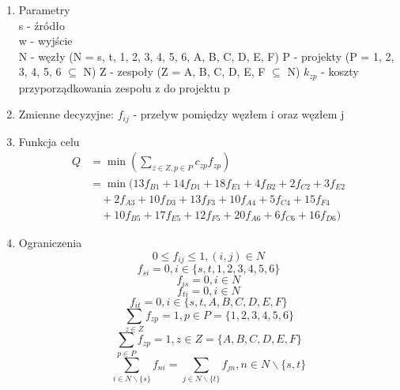 \begin{enumerate}
\item Parametry \\
s - źródło \\
w - wyjście \\
N - węzły (N = {s, t, 1, 2, 3, 4, 5, 6, A, B, C, D, E, F})
P - projekty (P = {1, 2, 3, 4, 5, 6} $\subseteq$ N)
Z - zespoły (Z = {A, B, C, D, E, F} $\subseteq$ N)
$k_{zp}$  - koszty przyporządkowania zespołu z do projektu p

\item Zmienne decyzyjne:
$f_{ij}$ - przeływ pomiędzy węzłem i oraz węzłem j
\item Funkcja celu
\begin{align*}
    Q &= \min \left(\sum_{z \in Z, p \in P} c_{zp}f_{zp} \right) \\
    &= \min \big( 13f_{B1} + 14f_{D1} + 18f_{E1} + 4f_{B2} + 2f_{C2} + 3f_{E2} \\
    &\quad + 2f_{A3} + 10f_{D3} + 13f_{F3} + 10f_{A4} + 5f_{C4} + 15f_{F4} \\
    &\quad + 10f_{B5} + 17f_{E5} + 12f_{F5} + 20f_{A6} + 6f_{C6} + 16f_{D6} \big)
\end{align*}


\item Ograniczenia
\setcounter{equation}{0}
\begin{equation}
0 \leq f_{ij} \leq 1, (i, j) \in N
\end{equation}
\begin{equation}
f_{si} = 0, i \in \{ s, t, 1, 2, 3, 4, 5, 6 \}
\end{equation}
\begin{equation}
f_{is} = 0, i \in N
\end{equation}
\begin{equation}
f_{ti} = 0, i \in N
\end{equation}
\begin{equation}
f_{it} = 0, i \in \{s, t, A, B, C, D, E, F\}
\end{equation}
\begin{equation}
\sum_{z \in Z} f_{zp} = 1, p \in P = \{ 1, 2, 3, 4, 5, 6 \}
\end{equation}
\begin{equation}
\sum_{p \in P} f_{zp} = 1, z \in Z = \{ A, B, C, D, E, F \}
\end{equation}
\begin{equation}
\sum_{i \in N \backslash \{s\}} f_{ni} = \sum_{j \in N \backslash \{t\}} f_{jn}, n \in N \backslash \{ s, t \}
\end{equation}

\end{enumerate}
